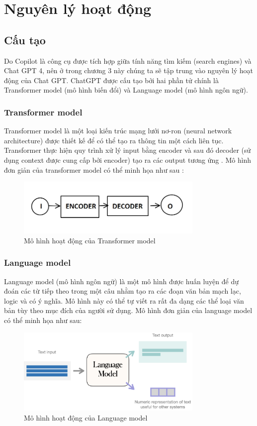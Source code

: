 \chapter{Nguyên lý hoạt động}
\section{Cấu tạo}
Do Copilot là công cụ được tích hợp giữa tính năng tìm kiếm (search engines) và Chat GPT 4, nên ở trong chương 3 này
chúng ta sẽ tập trung vào nguyên lý hoạt động của Chat GPT. ChatGPT được cấu tạo bởi hai phần tử chính là Transformer model (mô hình biến đổi) và Language model (mô hình ngôn ngữ).
\subsection{Transformer model}
Transformer model là một loại kiến trúc mạng lưới nơ-ron (neural network architecture)
được thiết kế để có thể tạo ra thông tin một cách liên tục. Transformer thực hiện quy trình xử lý input bằng encoder và sau đó decoder (sử dụng context được cung cấp bởi encoder) tạo ra các output tương ứng \cite{link_6}. Mô hình đơn giản của transformer model có thể minh họa như sau \cite{link_7}:
\begin{figure}[h]
    \centering
    \includegraphics[width=0.8\textwidth]{transformer.png}
    \caption{Mô hình hoạt động của Transformer model}
\end{figure}
\subsection{Language model}
Language model (mô hình ngôn ngữ) là một mô hình được huấn luyện để dự đoán các từ tiếp theo trong một câu nhằm tạo ra các đoạn văn bản mạch lạc, logic và có ý nghĩa. Mô hình này có thể tự viết ra rất đa dạng các thể loại văn bản tùy theo mục đích của người sử dụng. Mô hình đơn giản của language model có thể minh họa như sau:
\begin{figure}[h]
    \centering
    \includegraphics[width=0.8\textwidth]{Cohere-Language-Model.png}
    \caption{Mô hình hoạt động của Language model}
\end{figure}
